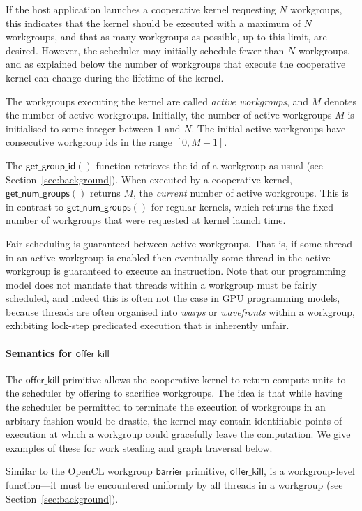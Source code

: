 \documentclass[nocopyrightspace]{sigplanconf-pldi16}
\newcommand{\offerkill}{\mathsf{offer\_kill}}
\newcommand{\getgroupid}{\mathsf{get\_group\_id}}
\newcommand{\getnumgroups}{\mathsf{get\_num\_groups}}
\begin{document}
If the host application launches a cooperative kernel requesting $N$
workgroups, this indicates that the kernel should be executed with a
maximum of $N$ workgroups, and that as many workgroups as possible, up
to this limit, are desired.  However, the scheduler may initially
schedule fewer than $N$ workgroups, and as explained below the number
of workgroups that execute the cooperative kernel can change during
the lifetime of the kernel.

The workgroups executing the kernel are called \emph{active
  workgroups}, and $M$ denotes the number of active workgroups.
Initially, the number of active workgroups $M$ is initialised to some
integer between $1$ and $N$.  The initial active workgroups have
consecutive workgroup ids in the range $[0, M-1]$.

The $\getgroupid()$ function retrieves the id of a workgroup as usual
(see Section~\ref{sec:background}).  When executed by a cooperative
kernel, $\getnumgroups()$ returns $M$, the \emph{current} number of
active workgroups.  This is in contrast to $\getnumgroups()$ for
regular kernels, which returns the fixed number of workgroups that
were requested at kernel launch time.

Fair scheduling is guaranteed between active workgroups.  That is, if
some thread in an active workgroup is enabled then eventually some
thread in the active workgroup is guaranteed to execute an
instruction.  Note that our programming model does not mandate that
threads within a workgroup must be fairly scheduled, and indeed this
is often not the case in GPU programming models, because threads are
often organised into \emph{warps} or \emph{wavefronts} within a
workgroup, exhibiting lock-step predicated execution that is
inherently unfair.

\paragraph{Semantics for $\offerkill$}

The $\offerkill$ primitive allows the cooperative kernel to return
compute units to the scheduler by offering to sacrifice workgroups.
The idea is that while having the scheduler be permitted to terminate
the execution of workgroups in an arbitary fashion would be drastic,
the kernel may contain identifiable points of execution at which a
workgroup could gracefully leave the computation.  We give examples of
these for work stealing and graph traversal below.

Similar to the OpenCL workgroup $\mathsf{barrier}$ primitive,
$\offerkill$, is a workgroup-level function---it must be encountered
uniformly by all threads in a workgroup (see
Section~\ref{sec:background}).
\end{document}
